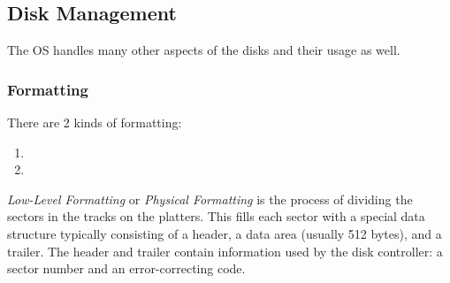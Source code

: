 \subsection{Disk Management}\label{subsec:Disk_Management}
The OS handles many other aspects of the disks and their usage as well.

\subsubsection{Formatting}\label{subsubsec:Formatting}
There are 2 kinds of formatting:
\begin{enumerate}[noitemsep]
\item {}
\item {}
\end{enumerate}

\begin{definition}\label{def:Low_Level_Formatting}
  \emph{Low-Level Formatting} or \emph{Physical Formatting} is the process of dividing the sectors in the tracks on the platters.
  This fills each sector with a special data structure typically consisting of a header, a data area (usually 512 bytes), and a trailer.
  The header and trailer contain information used by the disk controller: a sector number and an error-correcting code.
\end{definition}



